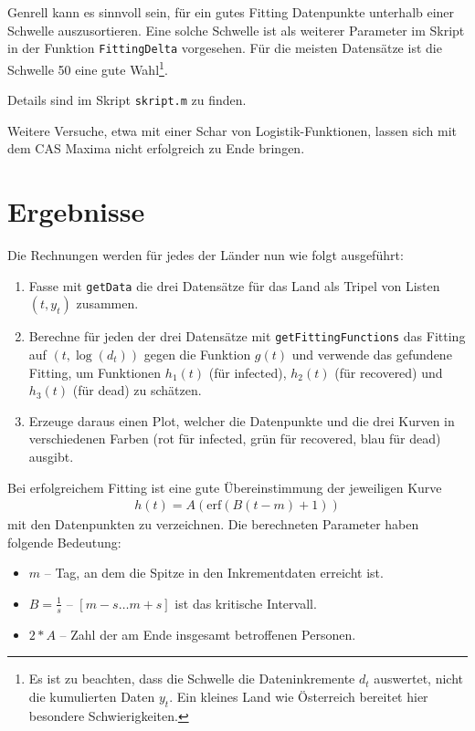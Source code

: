 \documentclass[a4paper,11pt]{article}
\newcommand{\br}[1]{\left(#1\right)}
\newcommand{\erf}{\mathrm{erf}}
\begin{document}
Genrell kann es sinnvoll sein, für ein gutes Fitting Datenpunkte unterhalb
einer Schwelle auszusortieren. Eine solche Schwelle ist als weiterer Parameter
im Skript in der Funktion \texttt{FittingDelta} vorgesehen. Für die meisten
Datensätze ist die Schwelle 50 eine gute Wahl\footnote{Es ist zu beachten,
  dass die Schwelle die Dateninkremente $d_t$ auswertet, nicht die kumulierten
  Daten $y_t$.  Ein kleines Land wie Österreich bereitet hier besondere
  Schwierigkeiten.}.

Details sind im Skript \texttt{skript.m} zu finden.

Weitere Versuche, etwa mit einer Schar von Logistik-Funktionen, lassen sich
mit dem CAS Maxima nicht erfolgreich zu Ende bringen. 

\section{Ergebnisse}

Die Rechnungen werden für jedes der Länder nun wie folgt ausgeführt:
\begin{enumerate}
\item Fasse mit \texttt{getData} die drei Datensätze für das Land als Tripel
  von Listen $(t,y_t)$ zusammen. 
\item Berechne für jeden der drei Datensätze mit \texttt{getFittingFunctions}
  das Fitting auf $(t,\log(d_t))$ gegen die Funktion $g(t)$ und verwende das
  gefundene Fitting, um Funktionen $h_1(t)$ (für infected), $h_2(t)$ (für
  recovered) und $h_3(t)$ (für dead) zu schätzen. 
\item Erzeuge daraus einen Plot, welcher die Datenpunkte und die drei Kurven
  in verschiedenen Farben (rot für infected, grün für recovered, blau für
  dead) ausgibt.  
\end{enumerate}
Bei erfolgreichem Fitting ist eine gute Übereinstimmung der jeweiligen Kurve
\begin{gather*}
  h(t)=A\br{\erf\br{B(t-m)+1}}
\end{gather*}
mit den Datenpunkten zu verzeichnen.  Die berechneten Parameter haben folgende
Bedeutung:
\begin{itemize}
\item $m$ -- Tag, an dem die Spitze in den Inkrementdaten erreicht ist.
\item $B=\frac{1}{s}$ -- $[m-s \ldots m+s]$ ist das kritische Intervall.
\item $2*A$ -- Zahl der am Ende insgesamt betroffenen Personen. 
\end{itemize}
\end{document}
